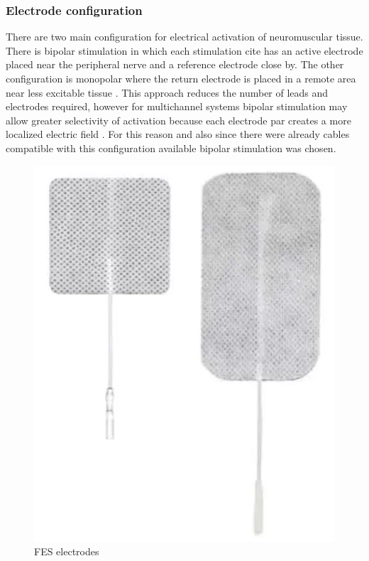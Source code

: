 \subsubsection{Electrode configuration}
There are two main configuration for electrical activation of neuromuscular tissue. There is bipolar stimulation in which each stimulation cite has an active electrode placed near the peripheral nerve and a reference electrode close by. The other configuration is monopolar where the return electrode is placed in a remote area near less excitable tissue \cite{peckham_functional_2005}. 
This approach reduces the number of leads and electrodes required, however for multichannel systems bipolar stimulation may allow greater selectivity of activation because each electrode par creates a more localized electric field \cite{grandjean_recruitment_1986}. For this reason and also since there were already cables compatible with this configuration available bipolar stimulation was chosen.
\begin{figure} 
    \centering
    \includegraphics[width=\linewidth]{images/electrodes.png}
    \caption{FES electrodes}
    \label{fig:electrodes}
\end{figure}

